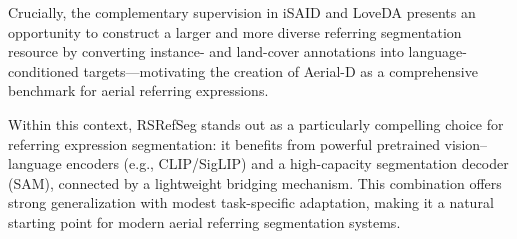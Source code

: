 Crucially, the complementary supervision in iSAID and LoveDA presents an opportunity to construct a larger and more diverse referring segmentation resource by converting instance- and land-cover annotations into language-conditioned targets—motivating the creation of Aerial-D as a comprehensive benchmark for aerial referring expressions.

Within this context, RSRefSeg stands out as a particularly compelling choice for referring expression segmentation: it benefits from powerful pretrained vision–language encoders (e.g., CLIP/SigLIP) and a high-capacity segmentation decoder (SAM), connected by a lightweight bridging mechanism. This combination offers strong generalization with modest task-specific adaptation, making it a natural starting point for modern aerial referring segmentation systems.
